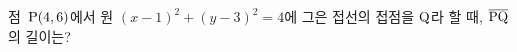 점~$\mathrm{P}(4{,}\mkern3mu\mathopen{}6)$에서 원 $(x-1)^2+(y-3)^2=4$에 그은 접선의 접점을 $\mathrm{Q}$라 할 때, $\overline{\mathrm{PQ}}$의 길이는?
